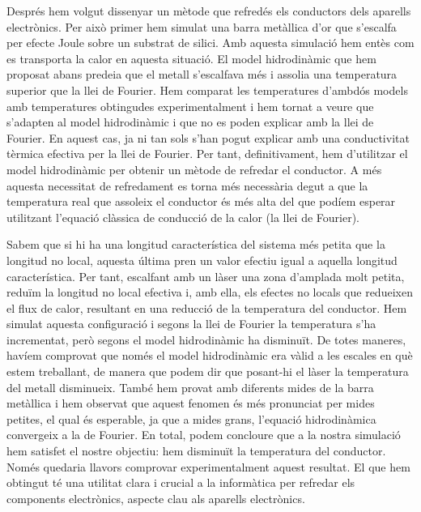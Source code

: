 \documentclass{article}
\begin{document}
Despr\'{e}s hem volgut dissenyar un m\`{e}tode que refred\'{e}s els conductors dels aparells electr\`{o}nics. Per aix\`{o} primer hem simulat una barra met\`{a}l\textperiodcentered lica d'or que s'escalfa per efecte Joule sobre un substrat de silici. Amb aquesta simulaci\'{o} hem ent\`{e}s com es transporta la calor en aquesta situaci\'{o}. El model hidrodin\`{a}mic que hem proposat abans predeia que el metall s'escalfava m\'{e}s i assolia una temperatura superior que la llei de Fourier. Hem comparat les temperatures d'ambd\'{o}s models amb temperatures obtingudes experimentalment i hem tornat a veure que s'adapten al model hidrodin\`{a}mic i que no es poden explicar amb la llei de Fourier. En aquest cas, ja ni tan sols s'han pogut explicar amb una conductivitat t\`{e}rmica efectiva per la llei de Fourier. Per tant, definitivament, hem d'utilitzar el model hidrodin\`{a}mic per obtenir un m\`{e}tode de refredar el conductor. A m\'{e}s aquesta necessitat de refredament es torna m\'{e}s necess\`{a}ria degut a que la temperatura real que assoleix el conductor \'{e}s m\'{e}s alta del que pod\'{i}em esperar utilitzant l'equaci\'{o} cl\`{a}ssica de conducci\'{o} de la calor (la llei de Fourier).

Sabem que si hi ha una longitud caracter\'{i}stica del sistema m\'{e}s petita que la longitud no local, aquesta \'{u}ltima pren un valor efectiu igual a aquella longitud caracter\'{i}stica. Per tant, escalfant amb un l\`{a}ser una zona d'amplada molt petita, redu\"{i}m la longitud no local efectiva i, amb ella, els efectes no locals que redueixen el flux de calor, resultant en una reducci\'{o} de la temperatura del conductor. Hem simulat aquesta configuraci\'{o} i segons la llei de Fourier la temperatura s'ha incrementat, per\`{o} segons el model hidrodin\`{a}mic ha disminu\"{i}t. De totes maneres, hav\'{i}em comprovat que nom\'{e}s el model hidrodin\`{a}mic era v\`{a}lid a les escales en qu\`{e} estem treballant, de manera que podem dir que posant-hi el l\`{a}ser la temperatura del metall disminueix. Tamb\'{e} hem provat amb diferents mides de la barra met\`{a}l\textperiodcentered lica i hem observat que aquest fenomen \'{e}s m\'{e}s pronunciat per mides petites, el qual \'{e}s esperable, ja que a mides grans, l'equaci\'{o} hidrodin\`{a}mica convergeix a la de Fourier. En total, podem concloure que a la nostra simulaci\'{o} hem satisfet el nostre objectiu: hem disminu\"{i}t la temperatura del conductor. Nom\'{e}s quedaria llavors comprovar experimentalment aquest resultat. El que hem obtingut t\'{e} una utilitat clara i crucial a la inform\`{a}tica per refredar els components electr\`{o}nics, aspecte clau als aparells electr\`{o}nics.
\end{document}
